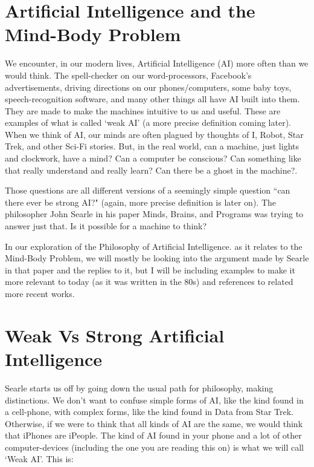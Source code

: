 \section{Artificial Intelligence and the Mind-Body Problem}
We encounter, in our modern lives, Artificial Intelligence (AI) more often than we would think. The spell-checker on our word-processors, Facebook's advertisements, driving directions on our phones/computers, some baby toys, speech-recognition software, and many other things all have AI built into them. They are made to make the machines intuitive to us and useful. These are examples of what is called `weak AI' (a more precise definition coming later). When we think of AI, our minds are often plagued by thoughts of I, Robot, Star Trek, and other Sci-Fi stories. But, in the real world, can a machine, just lights and clockwork, have a mind? Can a computer be conscious? Can something like that really understand and really learn? Can there be a ghost in the machine?.

Those questions are all different versions of a seemingly simple question ``can there ever be strong AI?" (again, more precise definition is later on). The philosopher John Searle in his paper Minds, Brains, and Programs was trying to answer just that. Is it possible for a machine to think?

In our exploration of the Philosophy of Artificial Intelligence\autocite{SEPAI}. as it relates to the Mind-Body Problem, we will mostly be looking into the argument made by Searle in that paper and the replies to it, but I will be including examples to make it more relevant to today (as it was written in the 80s) and references to related more recent works.

\section{Weak Vs Strong Artificial Intelligence}

Searle starts us off by going down the usual path for philosophy, making distinctions. We don't want to confuse simple forms of AI, like the kind found in a cell-phone, with complex forms, like the kind found in Data from Star Trek. Otherwise, if we were to think that all kinds of AI are the same, we would think that iPhones are iPeople. The kind of AI found in your phone and a lot of other computer-devices (including the one you are reading this on) is what we will call `Weak AI'. This is:


